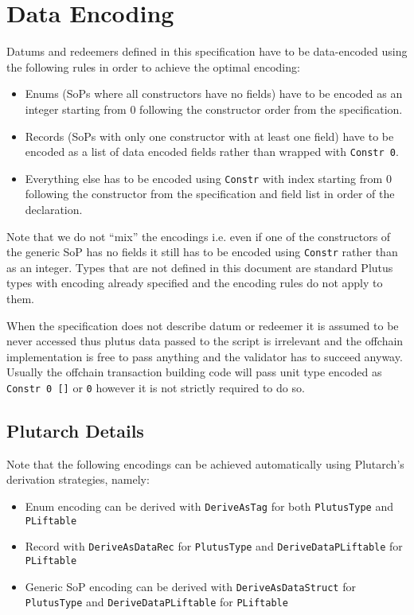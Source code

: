 \documentclass{article}
\begin{document}
\section{Data Encoding}

Datums and redeemers defined in this specification have to be data-encoded using the following rules in order to achieve the optimal encoding:

\begin{itemize}
  \item Enums (SoPs where all constructors have no fields) have to be encoded as an integer starting from $0$ following the constructor order from the specification.
  \item Records (SoPs with only one constructor with at least one field) have to be encoded as a list of data encoded fields rather than wrapped with \verb|Constr 0|.
  \item Everything else has to be encoded using \verb|Constr| with index starting from $0$ following the constructor from the specification and field list in order of the declaration.
\end{itemize}

Note that we do not ``mix'' the encodings i.e. even if one of the constructors of the generic SoP has no fields it still has to be encoded using \verb|Constr| rather than as an integer.
Types that are not defined in this document are standard Plutus types with encoding already specified and the encoding rules do not apply to them.

When the specification does not describe datum or redeemer it is assumed to be never accessed thus plutus data passed to the script is irrelevant and the offchain implementation is free to pass anything and the validator has to succeed anyway.
Usually the offchain transaction building code will pass unit type encoded as \verb|Constr 0 []| or \verb|0| however it is not strictly required to do so.

\subsection{Plutarch Details}

Note that the following encodings can be achieved automatically using Plutarch's derivation strategies, namely:

\begin{itemize}
  \item Enum encoding can be derived with \verb|DeriveAsTag| for both \verb|PlutusType| and \verb|PLiftable|
  \item Record with \verb|DeriveAsDataRec| for \verb|PlutusType| and \allowbreak \verb|DeriveDataPLiftable| for \verb|PLiftable|
  \item Generic SoP encoding can be derived with \verb|DeriveAsDataStruct| for \verb|PlutusType| and \verb|DeriveDataPLiftable| for \verb|PLiftable|
\end{itemize}
\end{document}
